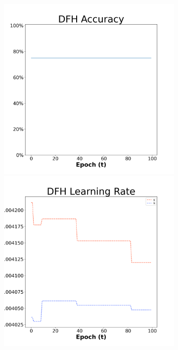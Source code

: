 \begin{figure}[H]
    \centering %
\begin{subfigure}{0.3\textwidth}
  \includegraphics[width=\linewidth]{images/exper1/Ionosphere/DFH_0.01_acc.png}
    \includegraphics[width=\linewidth]{images/exper1/Ionosphere/DFH_0.01_lr.png}

\end{subfigure}
\end{figure}
